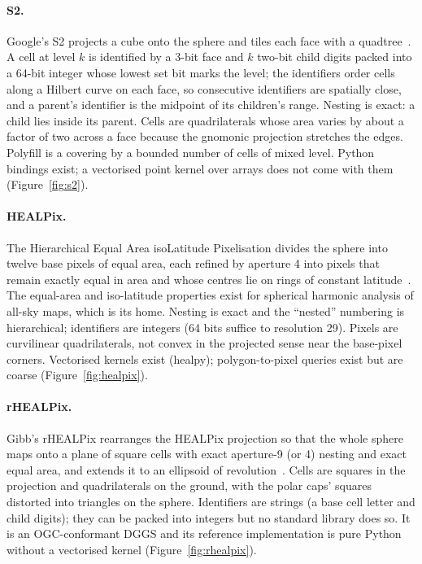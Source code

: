 \documentclass[10pt,a4paper]{article}
\begin{document}
\paragraph{S2.} Google's S2 projects a cube onto the sphere and tiles each face with a quadtree~\citep{s2docs}. A
cell at level $k$ is identified by a 3-bit face and $k$ two-bit child digits packed into a 64-bit integer whose
lowest set bit marks the level; the identifiers order cells along a Hilbert curve on each face, so consecutive
identifiers are spatially close, and a parent's identifier is the midpoint of its children's range. Nesting is
exact: a child lies inside its parent. Cells are quadrilaterals whose area varies by about a factor of two across
a face because the gnomonic projection stretches the edges. Polyfill is a covering by a bounded number of cells of
mixed level. Python bindings exist; a vectorised point kernel over arrays does not come with them
(Figure~\ref{fig:s2}).

\paragraph{HEALPix.} The Hierarchical Equal Area isoLatitude Pixelisation divides the sphere into twelve base
pixels of equal area, each refined by aperture 4 into pixels that remain exactly equal in area and whose centres lie
on rings of constant latitude~\citep{gorski2005}. The equal-area and iso-latitude properties exist for spherical
harmonic analysis of all-sky maps, which is its home. Nesting is exact and the ``nested'' numbering is hierarchical;
identifiers are integers (64 bits suffice to resolution 29). Pixels are curvilinear quadrilaterals, not convex in
the projected sense near the base-pixel corners. Vectorised kernels exist (healpy); polygon-to-pixel queries exist
but are coarse (Figure~\ref{fig:healpix}).

\paragraph{rHEALPix.} Gibb's rHEALPix rearranges the HEALPix projection so that the whole sphere maps onto a plane
of square cells with exact aperture-9 (or 4) nesting and exact equal area, and extends it to an ellipsoid of
revolution~\citep{gibb2016}. Cells are squares in the projection and quadrilaterals on the ground, with the polar
caps' squares distorted into triangles on the sphere. Identifiers are strings (a base cell letter and child
digits); they can be packed into integers but no standard library does so. It is an OGC-conformant DGGS and its
reference implementation is pure Python without a vectorised kernel (Figure~\ref{fig:rhealpix}).
\end{document}

